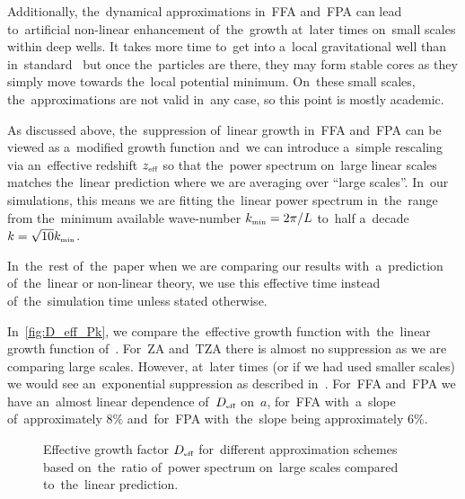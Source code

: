 Additionally, the~dynamical approximations in~FFA and~FPA can lead to~artificial non-linear enhancement of~the~growth at~later times on~small scales within deep wells. It takes more time to~get into a~local gravitational well than in~standard \nbody\ but once the~particles are there, they may form stable cores as they simply move towards the~local potential minimum. On~these small scales, the~approximations are not valid in~any case, so this point is mostly academic.

As discussed above, the~suppression of~linear growth in~FFA and~FPA can be viewed as a~modified growth function and~we can introduce a~simple rescaling via an~effective redshift $z_\text{\tiny eff}$ so that the~power spectrum on~large linear scales matches the~linear prediction
where we are averaging over ``large scales''. In~our simulations, this means we are fitting the~linear power spectrum in~the~range from the~minimum available wave-number $k_\text{\tiny min}=2\pi/L$ to~half a~decade $k=\sqrt{10}k_\text{\tiny min}$.

In~the~rest of~the~paper when we are comparing our results with~a~prediction of~the~linear or non-linear theory, we use this effective time instead of~the~simulation time unless stated otherwise.

In~\autoref{fig:D_eff_Pk}, we compare the~effective growth function with~the~linear growth function of~\LCDM. For~ZA and~TZA there is almost no suppression as we are comparing large scales. However, at~later times (or if we had used smaller scales) we would see an~exponential suppression as described in~\cite{Bharadwaj_1996}. For~FFA and~FPA we have an~almost linear dependence of~$D_\text{\tiny eff}$ on~$a$, for~FFA with~a~slope of~approximately $8\%$ and~for~FPA with~the~slope being approximately $6\%$.
\begin{figure}[!bt]
  \centering
    \begin{subfigure}{0.9\textwidth}
	\end{subfigure}
	\begin{subfigure}{0.9\textwidth}
	\end{subfigure}
  \caption{Effective growth factor $D_\text{\tiny eff}$ for~different approximation schemes based on~the~ratio of~power spectrum on~large scales compared to~the~linear prediction.}
  \label{fig:D_eff_Pk}
\end{figure}

